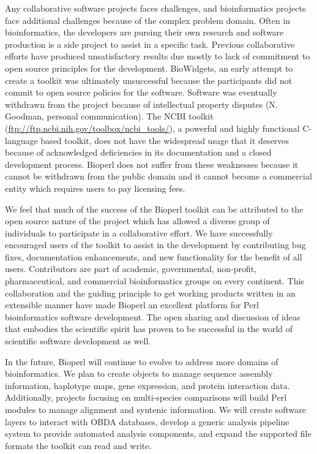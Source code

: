 \documentclass[12pt]{article}
\begin{document}
Any collaborative software projects faces challenges, and
bioinformatics projects face additional challenges because of the complex
problem domain.  Often in bioinformatics, the developers are pursing
their own research and software production is a side project to assist
in a specific task.  Previous collaborative efforts have produced
unsatisfactory results due mostly to lack of commitment to open source
principles for the development.  BioWidgets, an early attempt to
create a toolkit was ultimately unsuccessful because the participants did
not commit to open source policies for the software.  Software was
eventually withdrawn from the project because of intellectual property
disputes (N. Goodman, personal communication).  The NCBI toolkit
(\url{ftp://ftp.ncbi.nih.gov/toolbox/ncbi_tools/}), a powerful and highly functional C-language based
toolkit, does not have the widespread usage that it deserves
because of acknowledged deficiencies in its documentation and a closed
development process.  Bioperl does not suffer from these weaknesses
because it cannot be withdrawn from the public domain and it cannot
become a commercial entity which requires users to pay licensing
fees.

We feel that much of the success of the Bioperl toolkit can be
attributed to the open source nature of the project which has allowed
a diverse group of individuals to participate in a collaborative effort.
We have successfully encouraged users of the toolkit to assist in the
development by contributing bug fixes, documentation enhancements, and
new functionality for the benefit of all users.  Contributors are part
of academic, governmental, non-profit, pharmaceutical, and
commercial bioinformatics groups on every continent.  This collaboration and
the guiding principle to get working products written in an extensible
manner have made Bioperl an excellent platform for Perl bioinformatics
software development.  The open sharing and discussion of ideas that
embodies the scientific spirit has proven to be successful in the
world of scientific software development as well.

In the future, Bioperl will continue to evolve to address more domains
of bioinformatics.  We plan to create objects to manage sequence
assembly information, haplotype maps, gene expression, and protein
interaction data.  Additionally, projects focusing on multi-species
comparisons will build Perl modules to manage alignment and syntenic
information.  We will create software layers to interact with OBDA
databases, develop a generic analysis pipeline system to provide
automated analysis components, and expand the supported file formats
the toolkit can read and write.
\end{document}
